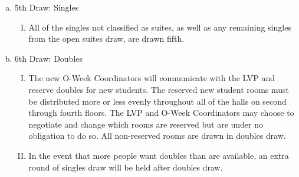 \documentclass[USletter,12pt]{article}
\begin{document}
\begin{enumerate}[(a)]
\begin{enumerate}[(a)]
\item 5th Draw: Singles
	\begin{enumerate}[(I)]
	\item All of the singles not classified as suites, as well as any remaining singles from the open suites draw, are drawn fifth.
	\end{enumerate}
\item 6th Draw: Doubles
	\begin{enumerate}[(I)]
	\item The new O-Week Coordinators will communicate with the LVP and reserve doubles for new students.  The reserved new student rooms must be distributed more or less evenly throughout all of the halls on second through fourth floors.  The LVP and O-Week Coordinators may choose to negotiate and change which rooms are reserved but are under no obligation to do so.  All non-reserved rooms are drawn in doubles draw.
	\item In the event that more people want doubles than are available, an extra round of singles draw will be held after doubles draw.
	\end{enumerate}
\end{enumerate}


\end{enumerate}
\end{document}
